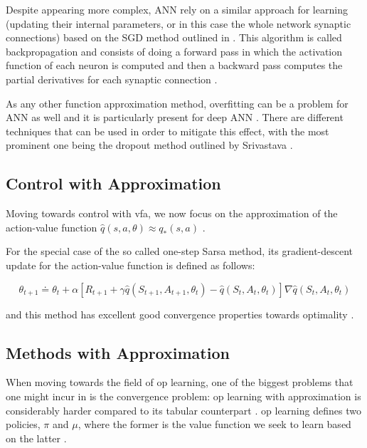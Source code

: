 \documentclass{seal_thesis}
\begin{document}

Despite appearing more complex, ANN rely on a similar approach for learning (\ie updating their internal parameters, or in this case the whole network synaptic connections) based on the SGD method outlined in  \cite[p. 217]{Sutton2017}. This algorithm is called backpropagation and consists of doing a forward pass in which the activation function of each neuron is computed and then a backward pass computes the partial derivatives for each synaptic connection \cite[p. 218]{Sutton2017}.

As any other function approximation method, overfitting can be a problem for ANN as well and it is particularly present for deep ANN \cite[p. 218]{Sutton2017}. There are different techniques that can be used in order to mitigate this effect, with the most prominent one being the dropout method outlined by Srivastava \cite{Srivastava2014}.

\subsection{ Control with Approximation}
\label{subsec:onpol_control}

Moving towards control with \gls{vfa}, we now focus on the approximation of the action-value function $\hat{q} (s,a,\theta) \approx q_* (s,a)$ \cite[p. 229]{Sutton2017}.

For the special case of the so called one-step Sarsa method, its gradient-descent update for the action-value function is defined as follows:

\begin{equation}
	\theta_{t+1} \doteq \theta_t + \alpha [ R_{t+1} + \gamma \hat{q} (S_{t+1}, A_{t+1}, \theta_t) - \hat{q} (S_t, A_t, \theta_t) ] \nabla \hat{q} (S_t, A_t, \theta_t)
\end{equation}

and this method has excellent good convergence properties towards optimality \cite[p. 230]{Sutton2017}.

\subsection{ Methods with Approximation}
\label{subsec:offpol_methods}

When moving towards the field of \gls{op} learning, one of the biggest problems that one might incur in is the convergence problem: \gls{op} learning with approximation is considerably harder compared to its tabular counterpart \cite[p. 243]{Sutton2017}. \gls{op} learning defines two policies, $\pi$ and $\mu$, where the former is the value function we seek to learn based on the latter \cite[p. 243]{Sutton2017}.
\end{document}
